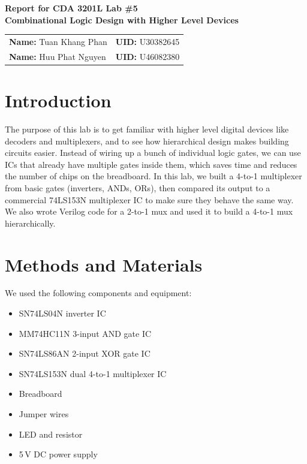 \documentclass[12pt, letterpaper]{article}
\begin{document}
\begin{center}
  {\large \textbf{Report for CDA 3201L Lab \#5}}\\[2pt]
  {\large \textbf{Combinational Logic Design with Higher Level Devices}}\\[8pt]
  \begin{tabular}{ll}
    \textbf{Name:} Tuan Khang Phan & \textbf{UID:} U30382645 \\
    \textbf{Name:} Huu Phat Nguyen & \textbf{UID:} U46082380 \\
  \end{tabular}
\end{center}

\section{Introduction}

The purpose of this lab is to get familiar with higher level digital devices like decoders and multiplexers, and to see how hierarchical design makes building circuits easier. Instead of wiring up a bunch of individual logic gates, we can use ICs that already have multiple gates inside them, which saves time and reduces the number of chips on the breadboard. In this lab, we built a 4-to-1 multiplexer from basic gates (inverters, ANDs, ORs), then compared its output to a commercial 74LS153N multiplexer IC to make sure they behave the same way. We also wrote Verilog code for a 2-to-1 mux and used it to build a 4-to-1 mux hierarchically.

\section{Methods and Materials}

We used the following components and equipment:

\begin{itemize}
  \item SN74LS04N inverter IC
  \item MM74HC11N 3-input AND gate IC
  \item SN74LS86AN 2-input XOR gate IC
  \item SN74LS153N dual 4-to-1 multiplexer IC
  \item Breadboard
  \item Jumper wires
  \item LED and resistor
  \item 5\,V DC power supply
\end{itemize}
\end{document}

